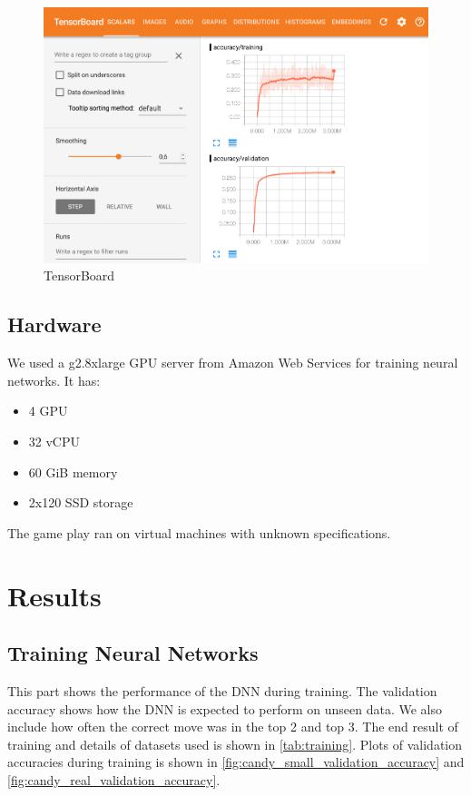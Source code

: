 \documentclass{kththesis}
\begin{document}
\begin{figure}
\centering
\includegraphics[width=\textwidth]{images/tensorboard.png}
\caption{TensorBoard}
\label{fig:tensorboard}
\end{figure}

\section{Hardware}
We used a g2.8xlarge GPU server from Amazon Web Services for training neural networks.
It has:
\begin{itemize}
\item  4 GPU
\item 32 vCPU
\item 60 GiB memory
\item  2x120 SSD storage
\end{itemize}

The game play ran on virtual machines with unknown specifications.




\chapter{Results}

\section{Training Neural Networks}
This part shows the performance of the DNN during training. The validation accuracy shows how the DNN is expected to perform on unseen data. We also include how often the correct move was in the top 2 and top 3. The end result of training and details of datasets used is shown in \ref{tab:training}. Plots of validation accuracies during training is shown in \ref{fig:candy_small_validation_accuracy} and \ref{fig:candy_real_validation_accuracy}.
\end{document}

